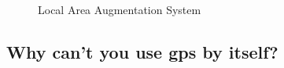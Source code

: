 \begin{figure}
	\centering
	\caption{Local Area Augmentation System}
	\label{fig:FAA_LAAS}
\end{figure}

\subsection{Why can't you use \ac{gps} by
itself?}\label{why-cant-you-use-gps-by-itself}

